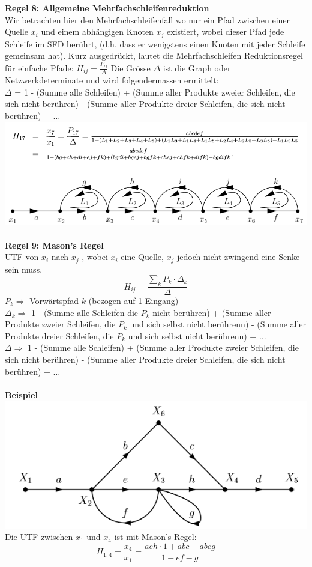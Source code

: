 \noindent\textbf{Regel 8: Allgemeine Mehrfachschleifenreduktion}\\
 Wir betrachten hier den Mehrfachschleifenfall wo nur ein Pfad
zwischen einer Quelle $x_i$ und einem abhängigen Knoten $x_j$
existiert, wobei dieser Pfad jede Schleife im SFD berührt, (d.h. 
dass er wenigstens einen Knoten mit jeder Schleife gemeinsam
hat). Kurz ausgedrückt, lautet die Mehrfachschleifen Reduktionsregel für 
einfache Pfade: $H_{ij} = \frac{P_{ij}}{\Delta}$
Die Grösse $\Delta$ ist die Graph oder Netzwerkdeterminate und wird folgendermassen ermittelt:~\\
$\Delta$  = 1 - (Summe alle Schleifen) + (Summe aller Produkte zweier Schleifen, die sich nicht berühren) - (Summe aller Produkte dreier Schleifen, die sich nicht berühren) + $\dots$
\includegraphics[width=\columnwidth]{Images/sfd_r8}~\\

\textbf{Regel 9: Mason's Regel}\\
UTF von $x_i$ nach $x_j$ , wobei $x_i$ eine Quelle, $x_j$ jedoch nicht zwingend eine Senke sein muss.
\[
H_{ij} = \frac{\sum_{k}P_k\cdot\Delta_k}{\Delta}
\]
$P_k \Rightarrow$ Vorwärtspfad $k$ (bezogen auf 1 Eingang)\\
$\Delta_k \Rightarrow $ 1 - (Summe alle Schleifen die $P_k$ nicht berühren) + (Summe aller Produkte zweier Schleifen, die $P_k$ und sich selbst nicht berührenn) - (Summe aller Produkte dreier Schleifen, die $P_k$ und sich selbst nicht berührenn) + $\dots$\\
$\Delta \Rightarrow $ 1 - (Summe alle Schleifen) + (Summe aller Produkte zweier Schleifen, die sich nicht berühren) - (Summe aller Produkte dreier Schleifen, die sich nicht berühren) + $\dots$\\
~\\ \textbf{Beispiel}\\
\includegraphics[width=\columnwidth]{Images/sfd_beispiel}
Die UTF zwischen $x_1$ und $x_4$ ist mit Mason's Regel:
\[
H_{1,4} = \frac{x_4}{x_1} = \frac{aeh \cdot 1 + abc - abcg}{1 - ef - g}
\]

